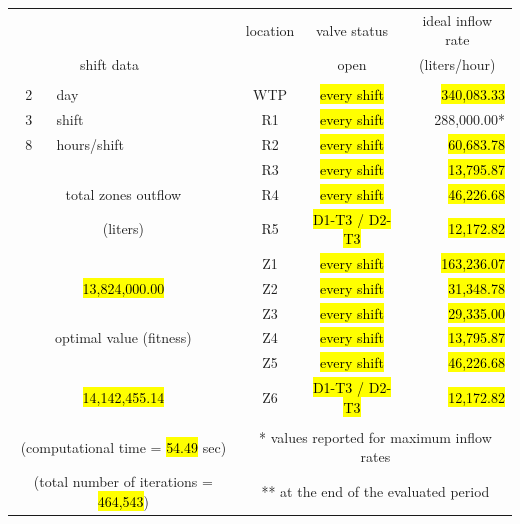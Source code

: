 \documentclass{singlecol}
\theoremstyle{TH}{
\newtheorem{lemma}{Lemma}
\newtheorem{theorem}[lemma]{Theorem}
\newtheorem{corrolary}[lemma]{Corrolary}
\newtheorem{conjecture}[lemma]{Conjecture}
\newtheorem{proposition}[lemma]{Proposition}
\newtheorem{claim}[lemma]{Claim}
\newtheorem{stheorem}[lemma]{Wrong Theorem}
\newtheorem{algorithm}{Algorithm}
}
\theoremstyle{THrm}{
\newtheorem{definition}{Definition}[section]
\newtheorem{question}{Question}[section]
\newtheorem{remark}{Remark}
\newtheorem{scheme}{Scheme}
}
\theoremstyle{THhit}{
\newtheorem{case}{Case}[section]
}
\begin{document}
\begin{table}[h!]
\begin{center}
\begin{small}
\begin{tabular}{ c r r r r r }
		   \\
		&  &      &  \multicolumn{1}{c}{location}    & \multicolumn{1}{c}{valve status}         & \multicolumn{1}{c}{ideal inflow rate}   \\
		\multicolumn{2}{c}{shift data}     &   &      & \multicolumn{1}{c}{open}        & \multicolumn{1}{c}{(liters/hour)}  \\
		   \\
		2   &  \multicolumn{1}{l}{day}   &              	& \multicolumn{1}{c}{WTP}    & \multicolumn{1}{c}{\hl{every shift}} &  \hl{340,083.33} \\
		3   &  \multicolumn{1}{l}{shift}  &         		& \multicolumn{1}{c}{R1}     & \multicolumn{1}{c}{\hl{every shift}} &  288,000.00*  \\
		8   &  \multicolumn{1}{l}{hours/shift}        &     & \multicolumn{1}{c}{R2}     & \multicolumn{1}{c}{\hl{every shift}} &   \hl{60,683.78}  \\
	   &      &              								& \multicolumn{1}{c}{R3}     & \multicolumn{1}{c}{\hl{every shift}} &   \hl{13,795.87}  \\
	   \multicolumn{3}{c}{total zones outflow}              & \multicolumn{1}{c}{R4}     & \multicolumn{1}{c}{\hl{every shift}} &   \hl{46,226.68}  \\
	   \multicolumn{3}{c}{(liters)}              		    & \multicolumn{1}{c}{R5}     & \multicolumn{1}{c}{\hl{D1-T3 / D2-T3}} &    \hl{12,172.82} \\
	   &      &              								& \multicolumn{1}{c}{Z1}     & \multicolumn{1}{c}{\hl{every shift}} &  \hl{163,236.07}  \\
	   \multicolumn{3}{c}{\hl{13,824,000.00}}              		& \multicolumn{1}{c}{Z2}     & \multicolumn{1}{c}{\hl{every shift}} &   \hl{31,348.78}  \\
	      &              &              					& \multicolumn{1}{c}{Z3}     & \multicolumn{1}{c}{\hl{every shift}} &   \hl{29,335.00}  \\
	   \multicolumn{3}{c}{optimal value (fitness)}          & \multicolumn{1}{c}{Z4}     & \multicolumn{1}{c}{\hl{every shift}} &   \hl{13,795.87}  \\
	   &             &             						    & \multicolumn{1}{c}{Z5}     & \multicolumn{1}{c}{\hl{every shift}} &   \hl{46,226.68}  \\
	   \multicolumn{3}{c}{\hl{14,142,455.14} }             		& \multicolumn{1}{c}{Z6}     & \multicolumn{1}{c}{\hl{D1-T3 / D2-T3}} &    \hl{12,172.82}  \\
	   \\
	   \multicolumn{3}{c}{(computational time = \hl{54.49} sec)} & \multicolumn{3}{c}{* values reported for maximum inflow rates} \\
	   \multicolumn{3}{c}{(total number of iterations = \hl{464,543})} & \multicolumn{3}{c}{** at the end of the evaluated period} 


\end{tabular}
\end{small}
\end{center}
\end{table}
\end{document}
